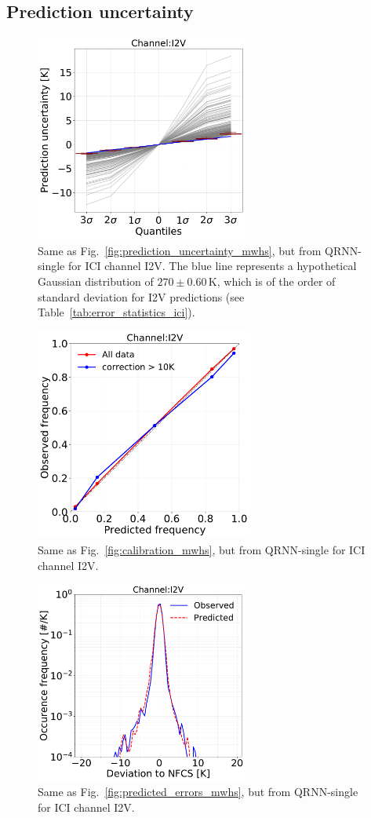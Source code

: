 \documentclass[amt, manuscript]{copernicus}
\begin{document}
\subsection{Prediction uncertainty}
\label{sec:prediction_uncertainty}
\begin{figure}[t]
	\includegraphics[width = 70mm]{Figures/prediction_uncertainty_I2V.pdf}	
	\caption{Same as Fig.~\ref{fig:prediction_uncertainty_mwhs}, but from QRNN-single for ICI channel I2V. The blue line represents a hypothetical Gaussian distribution of $270\pm0.60$\,K, which is of the order of standard deviation for I2V predictions (see Table~\ref{tab:error_statistics_ici}).}
	\label{fig:prediction_uncertainty_I2V}	
\end{figure}
\begin{figure}[t]
	\includegraphics[height = 70mm]{Figures/calibration_QRNN_I2V.pdf}	
	\caption{Same as Fig.~\ref{fig:calibration_mwhs}, but from QRNN-single for ICI channel I2V. }
	\label{fig:calibration_I1V}	
\end{figure}
\begin{figure}[t]
	\includegraphics[width=70mm]{Figures/deviation_posterior_samples_I2V.pdf}	
	\caption{Same as Fig.~\ref{fig:predicted_errors_mwhs}, but from QRNN-single for ICI channel I2V.}
	\label{fig:predicted_errors}	
\end{figure}
\end{document}
